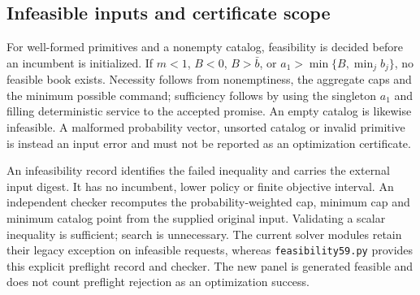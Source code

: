 \subsection{Infeasible inputs and certificate scope}\label{sec:infeasible59}
For well-formed primitives and a nonempty catalog, feasibility is decided before an incumbent is initialized. If $m<1$, $B<0$, $B>\bar b$, or $a_1>\min\{B,\min_jb_j\}$, no feasible book exists. Necessity follows from nonemptiness, the aggregate caps and the minimum possible command; sufficiency follows by using the singleton $a_1$ and filling deterministic service to the accepted promise. An empty catalog is likewise infeasible. A malformed probability vector, unsorted catalog or invalid primitive is instead an input error and must not be reported as an optimization certificate.

An infeasibility record identifies the failed inequality and carries the external input digest. It has no incumbent, lower policy or finite objective interval. An independent checker recomputes the probability-weighted cap, minimum cap and minimum catalog point from the supplied original input. Validating a scalar inequality is sufficient; search is unnecessary. The current solver modules retain their legacy exception on infeasible requests, whereas \texttt{feasibility59.py} provides this explicit preflight record and checker. The new panel is generated feasible and does not count preflight rejection as an optimization success.
